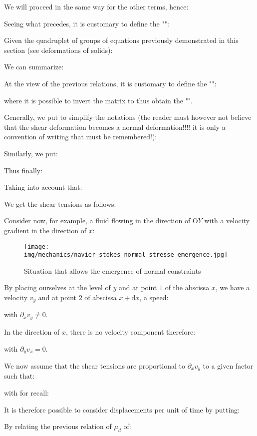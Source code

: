 	We will proceed in the same way for the other terms, hence:
	
	Seeing what precedes, it is customary to define the "":
	
	Given the quadruplet of groups of equations previously demonstrated in this section (see deformations of solids):
	
	We can summarize:
	
	At the view of the previous relations, it is customary to define the "":
	
	where it is possible to invert the matrix to thus obtain the "".

	Generally, we put to simplify the notations (the reader must however not believe that the shear deformation becomes a normal deformation!!!! it is only a convention of writing that must be remembered!):
	
	Similarly, we put:
	
	Thus finally:
	
	Taking into account that:
	
	We get the shear tensions as follows:
	
	Consider now, for example, a fluid flowing in the direction of O$Y$ with a velocity gradient in the direction of $x$:
	\begin{figure}[H]
		\centering
		\texttt{[image: img/mechanics/navier\_stokes\_normal\_stresse\_emergence.jpg]}
		\caption{Situation that allows the emergence of normal constraints}
	\end{figure}
	By placing ourselves at the level of $y$ and at point $1$ of the abscissa $x$, we have a velocity $v_y$ and at point $2$ of abscissa $x + \mathrm{d}x$, a speed:
	
	with $\partial_x v_y\neq 0$.
	
	In the direction of $x$, there is no velocity component therefore:
	
	with $\partial_y v_x=0$.
	
	We now assume that the shear tensions are proportional to $\partial_x v_y$ to a given factor such that:
	
	with for recall:
	
	It is therefore possible to consider displacements per unit of time by putting:
	
	By relating the previous relation of $\mu_d$ of:
	
